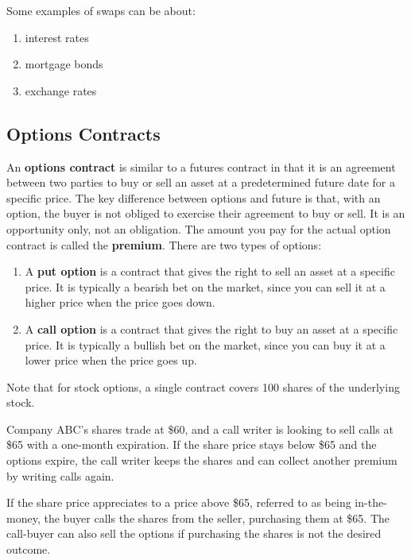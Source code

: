 \documentclass{article}
\begin{document}
    Some examples of swaps can be about: 
    \begin{enumerate}
      \item interest rates
      \item mortgage bonds 
      \item exchange rates
    \end{enumerate}

  \subsection{Options Contracts}

    \begin{definition}
      An \textbf{options contract} is similar to a futures contract in that it is an agreement between two parties to buy or sell an asset at a predetermined future date for a specific price. The key difference between options and future is that, with an option, the buyer is not obliged to exercise their agreement to buy or sell. It is an opportunity only, not an obligation. The amount you pay for the actual option contract is called the \textbf{premium}. There are two types of options: 
      \begin{enumerate}
          \item A \textbf{put option} is a contract that gives the right to sell an asset at a specific price. It is typically a bearish bet on the market, since you can sell it at a higher price when the price goes down. 
          \item A \textbf{call option} is a contract that gives the right to buy an asset at a specific price. It is typically a bullish bet on the market, since you can buy it at a lower price when the price goes up. 
      \end{enumerate}
      Note that for stock options, a single contract covers 100 shares of the underlying stock. 
    \end{definition}

    \begin{example}
      Company ABC's shares trade at \$60, and a call writer is looking to sell calls at \$65 with a one-month expiration. If the share price stays below \$65 and the options expire, the call writer keeps the shares and can collect another premium by writing calls again. 

      If the share price appreciates to a price above \$65, referred to as being in-the-money, the buyer calls the shares from the seller, purchasing them at \$65. The call-buyer can also sell the options if purchasing the shares is not the desired outcome.
    \end{example}
\end{document}
